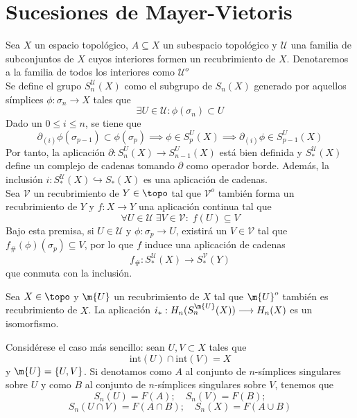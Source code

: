 \chapter{Sucesiones de Mayer-Vietoris}\label{MVTema}
Sea $X$ un espacio topológico, $A \subseteq X$ un subespacio topológico y $\mathcal{U}$ una familia de subconjuntos de $X$ cuyos interiores formen un recubrimiento de $X$. Denotaremos a la familia de todos los interiores como $\mathcal{U}^o$
\\

Se define el grupo $S^\mathcal{U}_n(X)$ como el subgrupo de $S_n(X)$ generado por aquellos símplices $\phi: \sigma_n \rightarrow X$ tales que $$\exists U \in \mathcal{U}: \phi(\sigma_n) \subset U$$ Dado un $0 \leq i \leq n$, se tiene que $$\partial_{(i)}\phi(\sigma_{p-1}) \subset \phi(\sigma_p) \implies \phi \in S^U_p(X) \implies \partial_{(i)}\phi \in S^U_{p-1}(X)$$ Por tanto, la aplicación $\partial: S^U_n(X) \longrightarrow S^U_{n-1}(X)$ está bien definida y $S^\mathcal{U}_*(X)$ define un complejo de cadenas tomando $\partial$ como operador borde. Además, la inclusión $i: S^\mathcal{U}_*(X) \hookrightarrow S_*(X)$ es una aplicación de cadenas.
\\

Sea $\mathcal{V}$ un recubrimiento de $Y \in \topo$ tal que $\mathcal{V}^o$ también forma un recubrimiento de $Y$ y $f: X \longrightarrow Y$ una aplicación continua tal que $$\forall U \in \mathcal{U}\; \exists V \in \mathcal{V}:\; f(U)\subseteq V$$ Bajo esta premisa, si $U \in \mathcal{U}$ y $\phi: \sigma_p \rightarrow U$, existirá un $V \in \mathcal{V}$ tal que $f_\#(\phi)(\sigma_p) \subseteq V$, por lo que $f$ induce una aplicación de cadenas $$f_\#: S^\mathcal{U}_*(X) \longrightarrow S^\mathcal{V}_*(Y)$$ que conmuta con la inclusión.
\\

\begin{teo}\label{IncIso}
Sea $X \in \topo$ y $\m{U}$ un recubrimiento de $X$ tal que $\m{U}^o$ también es recubrimiento de $X$. La aplicación $i_*: H_n(S_n^\m{U}(X)) \longrightarrow H_n(X)$ es un isomorfismo.
\end{teo}

Considérese el caso más sencillo: sean $U,V \subset X$ tales que $$\mbox{int}(U) \cap \mbox{int}(V)=X$$
y $\m{U}=\{U,V\}$. Si denotamos como $A$ al conjunto de $n$-símplices singulares sobre $U$ y como $B$ al conjunto de $n$-símplices singulares sobre $V$, tenemos que $$S_n(U)=F(A); \quad S_n(V)=F(B);$$ $$S_n(U \cap V)=F(A \cap B); \quad S_n(X)=F(A \cup B)$$

